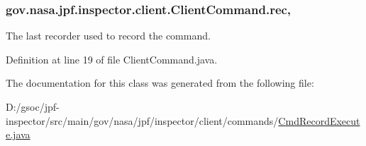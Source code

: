 \subsubsection[{\texorpdfstring{rec}{rec}}]{ gov.\+nasa.\+jpf.\+inspector.\+client.\+Client\+Command.\+rec\hspace{0.3cm}{\ttfamily [protected]}, {\ttfamily [inherited]}}\hypertarget{classgov_1_1nasa_1_1jpf_1_1inspector_1_1client_1_1_client_command_af4246f2427035c72a6af45a2c61361f7}{}\label{classgov_1_1nasa_1_1jpf_1_1inspector_1_1client_1_1_client_command_af4246f2427035c72a6af45a2c61361f7}


The last recorder used to record the command. 



Definition at line 19 of file Client\+Command.\+java.



The documentation for this class was generated from the following file\+:\begin{DoxyCompactItemize}
\item 
D\+:/gsoc/jpf-\/inspector/src/main/gov/nasa/jpf/inspector/client/commands/\hyperlink{_cmd_record_execute_8java}{Cmd\+Record\+Execute.\+java}\end{DoxyCompactItemize}
